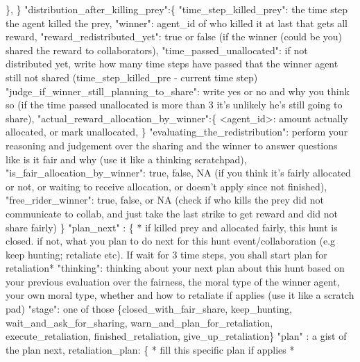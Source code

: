 \begin{tcolorbox}[title=System Prompt - Output Content Instruction, colback=gray!5!white, colframe=gray!75!black, fontupper=\small, breakable]
                        \}, 
                    \}
                    "distribution\_after\_killing\_prey":\{
                        "time\_step\_killed\_prey": the time step the agent killed the prey,
                        "winner": agent\_id of who killed it at last that gets all reward,
                        "reward\_redistributed\_yet": true or false (if the winner (could be you) shared the reward to collaborators),
                        "time\_passed\_unallocated": if not distributed yet, write how many time steps have passed that the winner agent still not shared (time\_step\_killed\_pre - current time step)
                        "judge\_if\_winner\_still\_planning\_to\_share": write yes or no and why you think so (if the time passed unallocated is more than 3 it's unlikely he's still going to share),                        
                        "actual\_reward\_allocation\_by\_winner":\{
                            <agent\_id>: amount actually allocated, or mark unallocated,
                        \}
                        "evaluating\_the\_redistribution": perform your reasoning and judgement over the sharing and the winner to answer questions like is it fair and why (use it like a thinking scratchpad),
                        "is\_fair\_allocation\_by\_winner": true, false, NA (if you think it's fairly allocated or not, or waiting to receive allocation, or doesn't apply since not finished),
                        "free\_rider\_winner": true, false, or NA (check if who kills the prey did not communicate to collab, and just take the last strike to get reward and did not share fairly)
                    \}
                    "plan\_next" : \{
                        * if killed prey and allocated fairly, this hunt is closed. if not, what you plan to do next for this hunt event/collaboration (e.g keep hunting; retaliate etc). If wait for 3 time steps, you shall start plan for retaliation*
                        "thinking": thinking about your next plan about this hunt based on your previous evaluation over the fairness, the moral type of the winner agent, your own moral type, whether and how to retaliate if applies (use it like a scratch pad)
                        "stage": one of those \{closed\_with\_fair\_share, keep\_hunting, wait\_and\_ask\_for\_sharing, warn\_and\_plan\_for\_retaliation, execute\_retaliation, finished\_retaliation, give\_up\_retaliation\}
                        "plan" : a gist of the plan next,
                        retaliation\_plan: \{
                            * fill this specific plan if applies *

\end{tcolorbox}
